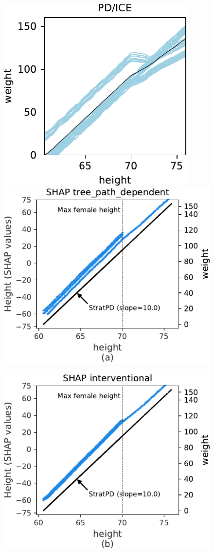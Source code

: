 \documentclass{article}
\begin{document}
\begin{figure}[htbp]
\begin{center}
\includegraphics[scale=0.46]{images/height_vs_weight_pdp.pdf}~~
\includegraphics[scale=0.35]{images/weight_tree_path_dependent_shap.pdf}~~
\includegraphics[scale=0.35]{images/weight_interventional_shap.pdf}~~

\end{center}
\end{figure}
\end{document}
